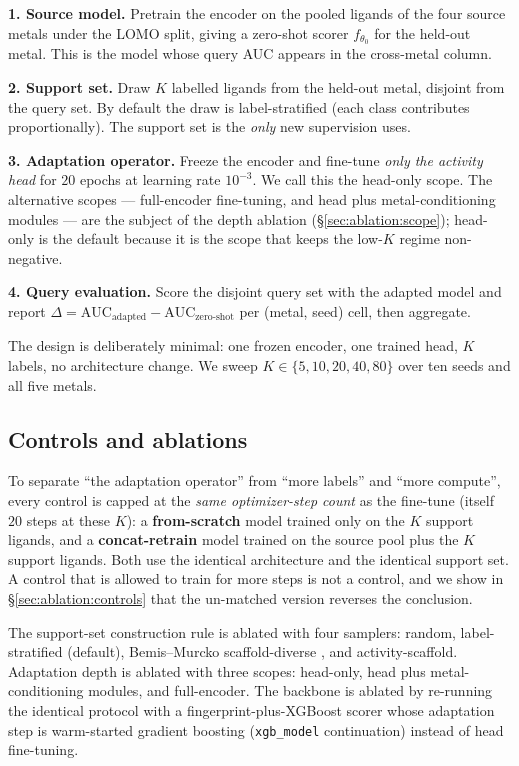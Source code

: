 \textbf{1. Source model.} Pretrain the encoder on the pooled ligands of the
four source metals under the LOMO split, giving a zero-shot scorer
$f_{\theta_0}$ for the held-out metal. This is the model whose query AUC appears
in the cross-metal column.

\textbf{2. Support set.} Draw $K$ labelled ligands from the held-out metal,
disjoint from the query set. By default the draw is label-stratified (each class
contributes proportionally). The support set is the \emph{only} new supervision
\fsma{} uses.

\textbf{3. Adaptation operator.} Freeze the encoder and fine-tune \emph{only
the activity head} for $20$ epochs at learning rate $10^{-3}$. We call this the
head-only scope. The alternative scopes --- full-encoder fine-tuning, and
head plus metal-conditioning modules --- are the subject of the depth ablation
(\S\ref{sec:ablation:scope}); head-only is the default because it is the
scope that keeps the low-$K$ regime non-negative.

\textbf{4. Query evaluation.} Score the disjoint query set with the adapted
model and report $\Delta = \mathrm{AUC}_{\text{adapted}} -
\mathrm{AUC}_{\text{zero-shot}}$ per (metal, seed) cell, then aggregate.

The design is deliberately minimal: one frozen encoder, one trained head, $K$
labels, no architecture change. We sweep $K\in\{5,10,20,40,80\}$ over ten seeds
and all five metals.

\subsection{Controls and ablations}
\label{sec:method:controls}

To separate ``the adaptation operator'' from ``more labels'' and ``more
compute'', every control is capped at the \emph{same optimizer-step count} as
the \fsma{} fine-tune (itself $20$ steps at these $K$): a
\textbf{from-scratch} model trained only on the $K$ support ligands, and a
\textbf{concat-retrain} model trained on the source pool plus the $K$ support
ligands. Both use the identical architecture and the identical support set. A
control that is allowed to train for more steps is not a control, and we show in
\S\ref{sec:ablation:controls} that the un-matched version reverses the
conclusion.

The support-set construction rule is ablated with four samplers: random,
label-stratified (default), Bemis--Murcko scaffold-diverse
\citep{bemis1996murcko}, and activity-scaffold. Adaptation depth is ablated with
three scopes: head-only, head plus metal-conditioning modules, and full-encoder.
The backbone is ablated by re-running the identical protocol with a
fingerprint-plus-XGBoost scorer whose adaptation step is warm-started gradient
boosting (\texttt{xgb\_model} continuation) instead of head fine-tuning.

